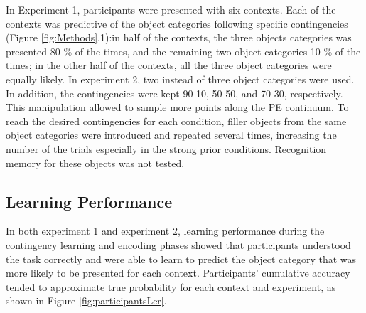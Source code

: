 \documentclass[a4paper,12pt]{article}
\begin{document}
In Experiment 1, participants were presented with six contexts. Each of the contexts was predictive of the object categories following specific contingencies (Figure \ref{fig:Methods}.1):in half of the contexts, the three objects categories was presented 80 \% of the times, and the remaining two object-categories 10 \% of the times; in the other half of the contexts, all the three object categories were equally likely. In experiment 2, two instead of three object categories were used. In addition, the contingencies were kept 90-10, 50-50, and 70-30, respectively. This manipulation allowed to sample more points along the PE continuum. To reach the desired contingencies for each condition, filler objects from the same object categories were introduced and repeated several times, increasing the number of the trials especially in the strong prior conditions. Recognition memory for these objects was not tested.

\subsection{Learning Performance}
In both experiment 1 and experiment 2, learning performance during the contingency learning and encoding phases showed that participants understood the task correctly and were able to learn to predict the object category that was more likely to be presented for each context. Participants’ cumulative accuracy tended to approximate true probability for each context and experiment, as shown in Figure \ref{fig:participantsLer}.
\end{document}
